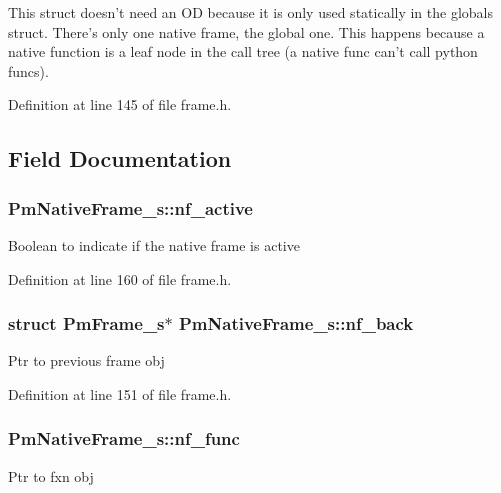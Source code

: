 This struct doesn't need an O\-D because it is only used statically in the globals struct. There's only one native frame, the global one. This happens because a native function is a leaf node in the call tree (a native func can't call python funcs). 

Definition at line 145 of file frame.\-h.



\subsection{Field Documentation}
\hypertarget{struct_pm_native_frame__s_abd348d8f2281f4e7fd480089ef1d3c70}{
\subsubsection[{nf\-\_\-active}]{ Pm\-Native\-Frame\-\_\-s\-::nf\-\_\-active}}\label{struct_pm_native_frame__s_abd348d8f2281f4e7fd480089ef1d3c70}
Boolean to indicate if the native frame is active 

Definition at line 160 of file frame.\-h.

\hypertarget{struct_pm_native_frame__s_a631c08a862be6fee47eeb687dca58d9c}{
\subsubsection[{nf\-\_\-back}]{\setlength{\rightskip}{0pt plus 5cm}struct {\bf Pm\-Frame\-\_\-s}$\ast$ Pm\-Native\-Frame\-\_\-s\-::nf\-\_\-back}}\label{struct_pm_native_frame__s_a631c08a862be6fee47eeb687dca58d9c}
Ptr to previous frame obj 

Definition at line 151 of file frame.\-h.

\hypertarget{struct_pm_native_frame__s_a6fb82e85649064a64cf7254d14455a1c}{
\subsubsection[{nf\-\_\-func}]{ Pm\-Native\-Frame\-\_\-s\-::nf\-\_\-func}}\label{struct_pm_native_frame__s_a6fb82e85649064a64cf7254d14455a1c}
Ptr to fxn obj 


